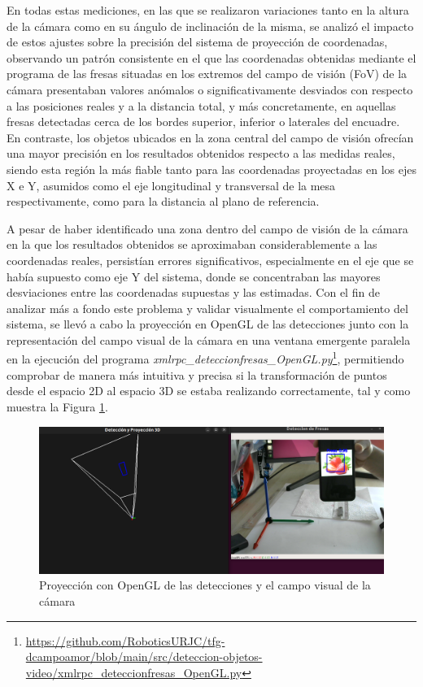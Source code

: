En todas estas mediciones, en las que se realizaron variaciones tanto en la altura de la cámara como en su ángulo de inclinación de la misma, se analizó el impacto de estos ajustes sobre la precisión del sistema de proyección de coordenadas, observando un patrón consistente en el que las coordenadas obtenidas mediante el programa de las fresas situadas en los extremos del campo de visión (FoV) de la cámara presentaban valores anómalos o significativamente desviados con respecto a las posiciones reales y a la distancia total, y más concretamente, en aquellas fresas detectadas cerca de los bordes superior, inferior o laterales del encuadre. En contraste, los objetos ubicados en la zona central del campo de visión ofrecían una mayor precisión en los resultados obtenidos respecto a las medidas reales, siendo esta región la más fiable tanto para las coordenadas proyectadas en los ejes X e Y, asumidos como el eje longitudinal y transversal de la mesa respectivamente, como para la distancia al plano de referencia.

A pesar de haber identificado una zona dentro del campo de visión de la cámara en la que los resultados obtenidos se aproximaban considerablemente a las coordenadas reales, persistían errores significativos, especialmente en el eje que se había supuesto como eje Y del sistema, donde se concentraban las mayores desviaciones entre las coordenadas supuestas y las estimadas. Con el fin de analizar más a fondo este problema y validar visualmente el comportamiento del sistema, se llevó a cabo la proyección en OpenGL de las detecciones junto con la representación del campo visual de la cámara en una ventana emergente paralela en la ejecución del programa \textit{xmlrpc\_deteccionfresas\_OpenGL.py}\footnote{\url{https://github.com/RoboticsURJC/tfg-dcampoamor/blob/main/src/deteccion-objetos-video/xmlrpc_deteccionfresas_OpenGL.py}}, permitiendo comprobar de manera más intuitiva y precisa si la transformación de puntos desde el espacio 2D al espacio 3D se estaba realizando correctamente, tal y como muestra la Figura \ref{fig:proy_OpenGL_deteccion}.

   \begin{figure}[H]
    \centering
    \begin{center}
      \includegraphics[width=155mm]{figs/Proyeccion plano mesa OpenGL con ejes coordenadas_2.png}
    \end{center}
    \caption{Proyección con OpenGL de las detecciones y el campo visual de la cámara}
    \label{fig:proy_OpenGL_deteccion}
  \end{figure}

